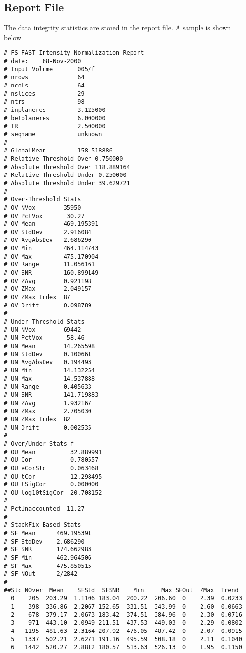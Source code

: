 \documentclass[10pt]{article}
\begin{document}
\subsection{Report File}

The data integrity statistics are stored in the report file. A sample
is shown below:

\begin{small}
\begin{verbatim}
# FS-FAST Intensity Normalization Report
# date:    08-Nov-2000
# Input Volume       005/f
# nrows              64
# ncols              64
# nslices            29
# ntrs               98
# inplaneres         3.125000
# betplaneres        6.000000
# TR                 2.500000
# seqname            unknown
# 
# GlobalMean         158.518886
# Relative Threshold Over 0.750000
# Absolute Threshold Over 118.889164
# Relative Threshold Under 0.250000
# Absolute Threshold Under 39.629721
# 
# Over-Threshold Stats
# OV NVox        35950
# OV PctVox       30.27
# OV Mean        469.195391
# OV StdDev      2.916084
# OV AvgAbsDev   2.686290
# OV Min         464.114743
# OV Max         475.170904
# OV Range       11.056161
# OV SNR         160.899149
# OV ZAvg        0.921198
# OV ZMax        2.049157
# OV ZMax Index  87
# OV Drift       0.098789
# 
# Under-Threshold Stats
# UN NVox        69442
# UN PctVox       58.46
# UN Mean        14.265598
# UN StdDev      0.100661
# UN AvgAbsDev   0.194493
# UN Min         14.132254
# UN Max         14.537888
# UN Range       0.405633
# UN SNR         141.719883
# UN ZAvg        1.932167
# UN ZMax        2.705030
# UN ZMax Index  82
# UN Drift       0.002535
# 
# Over/Under Stats f
# OU Mean          32.889991
# OU Cor           0.780557
# OU eCorStd       0.063468
# OU tCor          12.298495
# OU tSigCor       0.000000
# OU log10tSigCor  20.708152
# 
# PctUnaccounted  11.27
# 
# StackFix-Based Stats
# SF Mean      469.195391
# SF StdDev    2.686290
# SF SNR       174.662983
# SF Min       462.964506
# SF Max       475.850515
# SF NOut      2/2842
# 
##Slc NOver  Mean    SFStd  SFSNR    Min     Max SFOut  ZMax  Trend
  0    205  203.29  1.1106 183.04  200.22  206.60  0    2.39  0.0233
  1    398  336.86  2.2067 152.65  331.51  343.99  0    2.60  0.0663
  2    678  379.17  2.0673 183.42  374.51  384.96  0    2.30  0.0716
  3    971  443.10  2.0949 211.51  437.53  449.03  0    2.29  0.0802
  4   1195  481.63  2.3164 207.92  476.05  487.42  0    2.07  0.0915
  5   1337  502.21  2.6271 191.16  495.59  508.18  0    2.11  0.1040
  6   1442  520.27  2.8812 180.57  513.63  526.13  0    1.95  0.1150

\end{verbatim}
\end{small}
\end{document}
